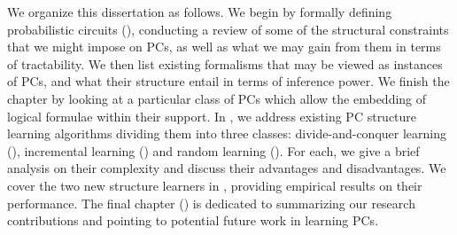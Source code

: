 We organize this dissertation as follows. We begin  by formally defining probabilistic
circuits (), conducting a review of some of the structural constraints that we might
impose on PCs, as well as what we may gain from them in terms of tractability.
We then list existing formalisms that may be viewed as instances of PCs, and what their structure
entail in terms of inference power. We finish the chapter by looking at a particular class of PCs
which allow the embedding of logical formulae within their support. In , we address existing PC structure
learning algorithms dividing them into three classes: divide-and-conquer learning
(), incremental learning () and random learning
(). For each, we give a brief analysis on their complexity and discuss their
advantages and disadvantages. We cover the two new structure learners in ,
providing empirical results on their performance. The final chapter () is
dedicated to summarizing our research contributions and pointing to potential future work in
learning PCs.

